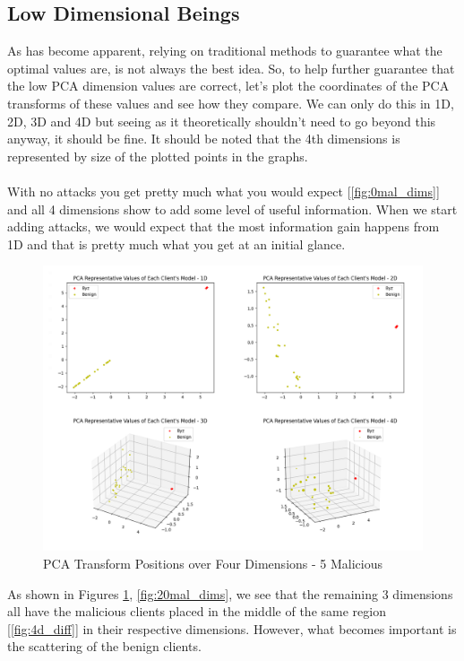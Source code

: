 \subsection{Low Dimensional Beings}
As has become apparent, relying on traditional methods to guarantee what the optimal values are, is not always the best idea.
So, to help further guarantee that the low PCA dimension values are correct, let's plot the coordinates of the PCA transforms of these values and see how they compare.
We can only do this in 1D, 2D, 3D and 4D but seeing as it theoretically shouldn't need to go beyond this anyway, it should be fine.
It should be noted that the 4th dimensions is represented by size of the plotted points in the graphs.
\\ \\
With no attacks you get pretty much what you would expect [\ref{fig:0mal_dims}] and all 4 dimensions show to add some level of useful information.
When we start adding attacks, we would expect that the most information gain happens from 1D and that is pretty much what you get at an initial glance.
\begin{figure}[htbp]
	\centering
    \includegraphics[scale=0.33]{my_agg/graphs/5mal_dims.png}
	\caption{PCA Transform Positions over Four Dimensions - 5 Malicious}
	\label{fig:5mal_dims}
\end{figure}
As shown in Figures \ref{fig:5mal_dims}, \ref{fig:20mal_dims}, we see that the remaining 3 dimensions all have the malicious clients placed in the middle of the same region [\ref{fig:4d_diff}] in their respective dimensions.
However, what becomes important is the scattering of the benign clients.
